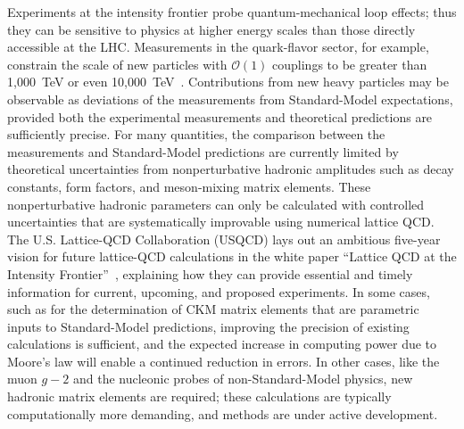 Experiments at the intensity frontier probe quantum-mechanical loop effects;
thus they can be sensitive to physics at higher energy scales than those
directly accessible at the LHC.  Measurements in the quark-flavor sector, for
example, constrain the scale of new particles with ${\mathcal O}(1)$ couplings
to be greater than 1,000~TeV or even 10,000~TeV~\cite{Isidori:2010kg}.
Contributions from new heavy particles may be observable as deviations of the
measurements from Standard-Model expectations, provided both the experimental
measurements and theoretical predictions are sufficiently precise.  For many
quantities, the comparison between the measurements and Standard-Model
predictions are currently limited by theoretical uncertainties from
nonperturbative hadronic amplitudes such as decay constants, form factors, and
meson-mixing matrix elements.  These nonperturbative hadronic parameters can
only be calculated with controlled uncertainties that are systematically
improvable using numerical lattice QCD.  The U.S. Lattice-QCD Collaboration
(USQCD) lays out an ambitious five-year vision for future lattice-QCD
calculations in the white paper ``Lattice QCD at the Intensity
Frontier''~\cite{USQCD_IF_whitepaper13}, explaining how they can provide
essential and timely information for current, upcoming, and proposed
experiments.  In some cases, such as for the determination of CKM matrix
elements that are parametric inputs to Standard-Model predictions, improving
the precision of existing calculations is sufficient, and the expected
increase in computing power due to Moore's law will enable a continued
reduction in errors.  In other cases, like the muon $g-2$ and the nucleonic
probes of non-Standard-Model physics, new hadronic matrix elements are
required; these calculations are typically computationally more demanding, and
methods are under active development.

